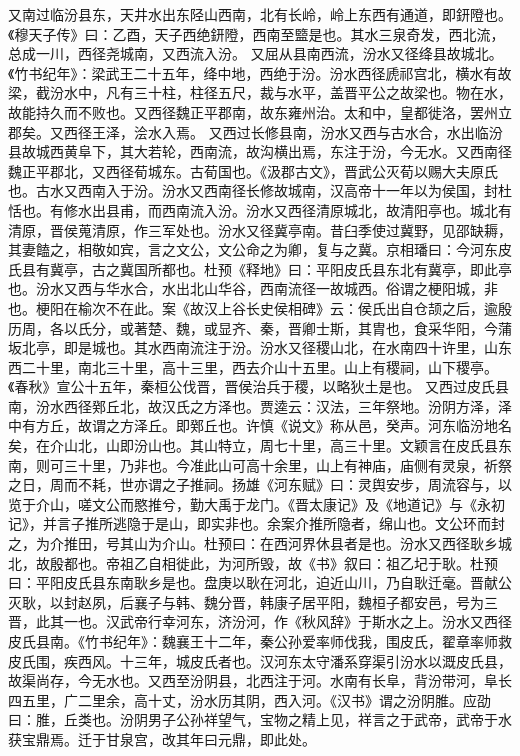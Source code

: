 \documentclass[12pt,UTF8]{ctexbook}
\begin{document}
又南过临汾县东，天井水出东陉山西南，北有长岭，岭上东西有通道，即鈃隥也。《穆天子传》曰：乙酉，天子西绝鈃隥，西南至盬是也。其水三泉奇发，西北流，总成一川，西径尧城南，又西流入汾。
又屈从县南西流，汾水又径绛县故城北。《竹书纪年》：梁武王二十五年，绛中地，西绝于汾。汾水西径虒祁宫北，横水有故梁，截汾水中，凡有三十柱，柱径五尺，裁与水平，盖晋平公之故梁也。物在水，故能持久而不败也。又西径魏正平郡南，故东雍州治。太和中，皇都徙洛，罢州立郡矣。又西径王泽，浍水入焉。
又西过长修县南，汾水又西与古水合，水出临汾县故城西黄阜下，其大若轮，西南流，故沟横出焉，东注于汾，今无水。又西南径魏正平郡北，又西径荀城东。古荀国也。《汲郡古文》，晋武公灭荀以赐大夫原氏也。古水又西南入于汾。汾水又西南径长修故城南，汉高帝十一年以为侯国，封杜恬也。有修水出县甫，而西南流入汾。汾水又西径清原城北，故清阳亭也。城北有清原，晋侯蒐清原，作三军处也。汾水又径冀亭南。昔臼季使过冀野，见邵缺耨，其妻饁之，相敬如宾，言之文公，文公命之为卿，复与之冀。京相璠曰：今河东皮氏县有冀亭，古之冀国所都也。杜预《释地》曰：平阳皮氏县东北有冀亭，即此亭也。汾水又西与华水合，水出北山华谷，西南流径一故城西。俗谓之梗阳城，非也。梗阳在榆次不在此。案《故汉上谷长史侯相碑》云：侯氏出自仓颉之后，逾殷历周，各以氏分，或著楚、魏，或显齐、秦，晋卿士斯，其胄也，食采华阳，今蒲坂北亭，即是城也。其水西南流注于汾。汾水又径稷山北，在水南四十许里，山东西二十里，南北三十里，高十三里，西去介山十五里。山上有稷祠，山下稷亭。《春秋》宣公十五年，秦桓公伐晋，晋侯治兵于稷，以略狄土是也。
又西过皮氏县南，汾水西径鄈丘北，故汉氏之方泽也。贾逵云：汉法，三年祭地。汾阴方泽，泽中有方丘，故谓之方泽丘。即鄈丘也。许慎《说文》称从邑，癸声。河东临汾地名矣，在介山北，山即汾山也。其山特立，周七十里，高三十里。文颖言在皮氏县东南，则可三十里，乃非也。今准此山可高十余里，山上有神庙，庙侧有灵泉，祈祭之日，周而不耗，世亦谓之子推祠。扬雄《河东赋》曰：灵舆安步，周流容与，以览于介山，嗟文公而愍推兮，勤大禹于龙门。《晋太康记》及《地道记》与《永初记》，并言子推所逃隐于是山，即实非也。余案介推所隐者，绵山也。文公环而封之，为介推田，号其山为介山。杜预曰：在西河界休县者是也。汾水又西径耿乡城北，故殷都也。帝祖乙自相徙此，为河所毁，故《书》叙曰：祖乙圮于耿。杜预曰：平阳皮氏县东南耿乡是也。盘庚以耿在河北，迫近山川，乃自耿迁毫。晋献公灭耿，以封赵夙，后襄子与韩、魏分晋，韩康子居平阳，魏桓子都安邑，号为三晋，此其一也。汉武帝行幸河东，济汾河，作《秋风辞》于斯水之上。汾水又西径皮氏县南。《竹书纪年》：魏襄王十二年，秦公孙爱率师伐我，围皮氏，翟章率师救皮氏围，疾西风。十三年，城皮氏者也。汉河东太守潘系穿渠引汾水以溉皮氏县，故渠尚存，今无水也。又西至汾阴县，北西注于河。水南有长阜，背汾带河，阜长四五里，广二里余，高十丈，汾水历其阴，西入河。《汉书》谓之汾阴脽。应劭曰：脽，丘类也。汾阴男子公孙祥望气，宝物之精上见，祥言之于武帝，武帝于水获宝鼎焉。迁于甘泉宫，改其年曰元鼎，即此处。
\end{document}
